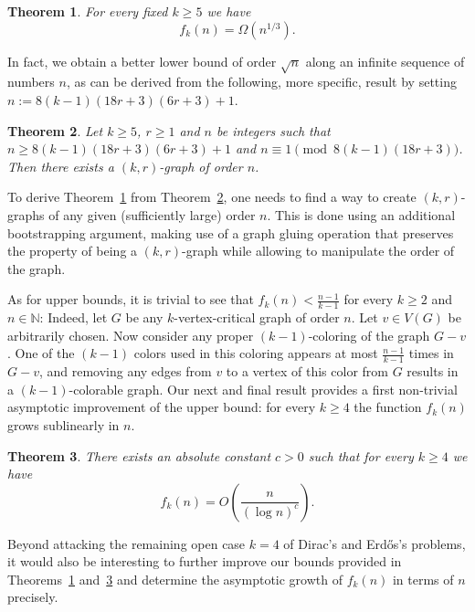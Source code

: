 \documentclass[a4paper,10pt,hidelinks]{amsart}
\newtheorem{theorem}{Theorem}[section]
\theoremstyle{definition}
\begin{document}
\begin{theorem}\label{thm:lowerbound}
For every fixed $k\ge 5$ we have
$$f_k(n)=\Omega(n^{1/3}).$$
\end{theorem}

In fact, we obtain a better lower bound of order $\sqrt{n}$ along an infinite sequence of numbers $n$, as can be derived from the following, more specific, result by setting $n:=8(k-1)(18r+3)(6r+3)+1$.

\begin{theorem}\label{main-thm-short}
    Let $k\ge 5$, $r \geq 1$ and $n$ be integers such that $n\ge 8(k-1)(18r+3)(6r+3)+1$ and $n\equiv 1 \pmod{8(k-1)(18r+3)}$. Then there exists a $(k,r)$-graph of order $n$.
\end{theorem}
To derive Theorem~\ref{thm:lowerbound} from Theorem~\ref{main-thm-short}, one needs to find a way to create $(k,r)$-graphs of any given (sufficiently large) order $n$. This is done using an additional bootstrapping argument, making use of a graph gluing operation that preserves the property of being a $(k,r)$-graph while allowing to manipulate the order of the graph.

As for upper bounds, it is trivial to see that $f_k(n)< \frac{
n-1}{k-1}$ for every $k\ge 2$ and $n\in \mathbb{N}$: Indeed, let $G$ be any $k$-vertex-critical graph of order $n$. Let $v\in V(G)$ be arbitrarily chosen. Now consider any proper $(k-1)$-coloring of the graph $G-v$. One of the $(k-1)$ colors used in this coloring appears at most $\frac{n-1}{k-1}$ times in $G-v$, and removing any edges from $v$ to a vertex of this color from $G$ results in a $(k-1)$-colorable graph. Our next and final result provides a first non-trivial asymptotic improvement of the upper bound: for every $k\ge 4$ the function $f_k(n)$ grows sublinearly in $n$.
\begin{theorem}\label{thm:upperbound}
There exists an absolute constant $c>0$ such that for every $k\ge 4$ we have
$$f_k(n)=O\left(\frac{n}{(\log n)^c}\right).$$
\end{theorem}
Beyond attacking the remaining open case $k=4$ of Dirac's and Erd\H{o}s's problems, it would also be interesting to further improve our bounds provided in Theorems~\ref{thm:lowerbound} and~\ref{thm:upperbound} and determine the asymptotic growth of $f_k(n)$ in terms of $n$ precisely.

\medskip
\end{document}
